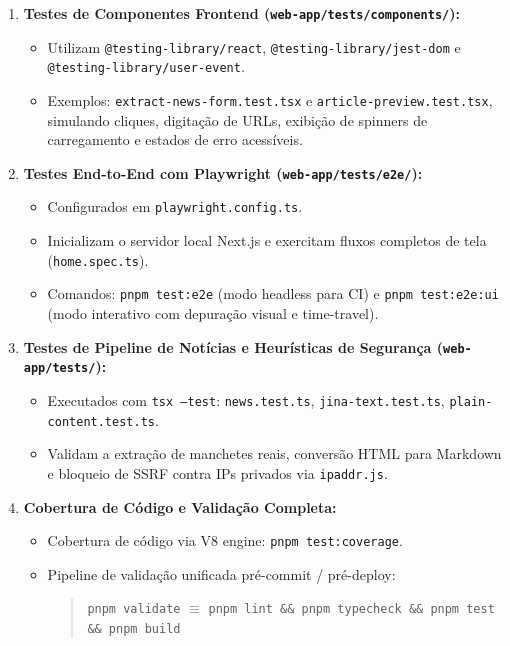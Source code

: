 \documentclass[12pt,a4paper]{article}
\begin{document}
\begin{enumerate}
\begin{itemize}
  \end{itemize}
  \item \textbf{Testes de Componentes Frontend (\texttt{web-app/tests/components/}):}
  \begin{itemize}
    \item Utilizam \texttt{@testing-library/react}, \texttt{@testing-library/jest-dom} e \texttt{@testing-library/user-event}.
    \item Exemplos: \texttt{extract-news-form.test.tsx} e \texttt{article-preview.test.tsx}, simulando cliques, digitação de URLs, exibição de spinners de carregamento e estados de erro acessíveis.
  \end{itemize}
  \item \textbf{Testes End-to-End com Playwright (\texttt{web-app/tests/e2e/}):}
  \begin{itemize}
    \item Configurados em \texttt{playwright.config.ts}.
    \item Inicializam o servidor local Next.js e exercitam fluxos completos de tela (\texttt{home.spec.ts}).
    \item Comandos: \texttt{pnpm test:e2e} (modo headless para CI) e \texttt{pnpm test:e2e:ui} (modo interativo com depuração visual e time-travel).
  \end{itemize}
  \item \textbf{Testes de Pipeline de Notícias e Heurísticas de Segurança (\texttt{web-app/tests/}):}
  \begin{itemize}
    \item Executados com \texttt{tsx --test}: \texttt{news.test.ts}, \texttt{jina-text.test.ts}, \texttt{plain-content.test.ts}.
    \item Validam a extração de manchetes reais, conversão HTML para Markdown e bloqueio de SSRF contra IPs privados via \texttt{ipaddr.js}.
  \end{itemize}
  \item \textbf{Cobertura de Código e Validação Completa:}
  \begin{itemize}
    \item Cobertura de código via V8 engine: \texttt{pnpm test:coverage}.
    \item Pipeline de validação unificada pré-commit / pré-deploy:
    \begin{quote}
      \texttt{pnpm validate} $\equiv$ \texttt{pnpm lint \&\& pnpm typecheck \&\& pnpm test \&\& pnpm build}
    \end{quote}
  \end{itemize}
\end{enumerate}
\end{document}

